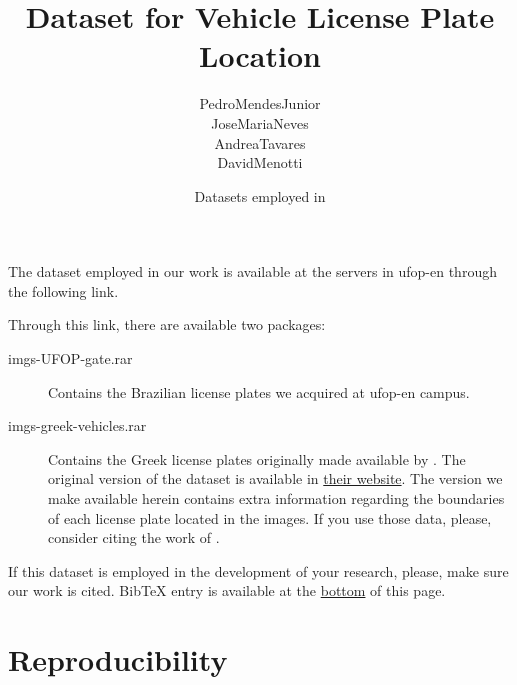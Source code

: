 

% 

\renewcommand\highlightauthorname[1]{#1}

\title{Dataset for Vehicle License Plate Location}
\author{\gls{PedroMendesJunior}\\%
  \gls{JoseMariaNeves}\\%
  \gls{AndreaTavares}\\%
  \gls{DavidMenotti}\\%
}
\date{Datasets employed in }



\maketitle

The dataset employed in our work  is available at the servers in \gls{ufop-en} through the following link.

\begin{center}
\end{center}

Through this link, there are available two packages:

\begin{description}
\item[imgs-UFOP-gate.rar]
  Contains the Brazilian license plates we acquired at \gls{ufop-en} campus.
\item[imgs-greek-vehicles.rar]
  Contains the Greek license plates originally made available by .
  The original version of the dataset is available in \href{http://www.medialab.ntua.gr/research/LPRdatabase.html}{their website}.
  The version we make available herein contains extra information regarding the boundaries of each license plate located in the images.
  If you use those data, please, consider citing the work of .
\end{description}

If this dataset is employed in the development of your research, please, make sure our work  is cited.
BibTeX entry is available at the \hyperref[ref:MendesJunior2011]{bottom} of this page.

\section*{Reproducibility}

